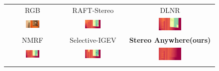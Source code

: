 \documentclass[10pt,twocolumn,letterpaper]{article}
\newcommand{\method}[0]{Stereo Anywhere\xspace}
\begin{document}
\begin{figure}[h]
    \centering
    \renewcommand{\tabcolsep}{1pt}
    \begin{tabular}{ccc}
        \small RGB &
        \small RAFT-Stereo \cite{lipson2021raft} &
        \small DLNR \cite{zhao2023high} \\
        \includegraphics[width=0.27\textwidth]{imgs/layeredflow/rgb/37.jpg} &
        \includegraphics[width=0.27\textwidth]{imgs/layeredflow/stereo/RAFT-Stereo/37.jpg} &
        \includegraphics[width=0.27\textwidth]{imgs/layeredflow/stereo/DLNR/37.jpg} \\
        \small NMRF \cite{guan2024neural} &
        \small Selective-IGEV \cite{wang2024selective} &
        \textbf{\method (ours)} \\
        \includegraphics[width=0.27\textwidth]{imgs/layeredflow/stereo/NMRF/37.jpg} &
        \includegraphics[width=0.27\textwidth]{imgs/layeredflow/stereo/Selective/37.jpg} &
        \includegraphics[width=0.27\textwidth]{imgs/layeredflow/stereo/Ours/37.jpg} \\ \\


\end{tabular}
\end{figure}
\end{document}
